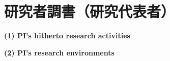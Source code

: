 
\section{研究者調書（研究代表者）}

\renewcommand{\研究者氏名}{湯川秀樹}
\renewcommand{\研究者氏名ふりがな}{ゆかわ　ひでき}
\renewcommand{\研究者生年月日の年}{1900}
\renewcommand{\研究者生年月日の月}{2}
\renewcommand{\研究者生年月日の日}{29}
\renewcommand{\研究者年齢}{139}
\renewcommand{\研究者所属機関部局職}{\small{逢坂大学\\ 原始殻研究所\\ 名誉教授}}	%
\renewcommand{\研究者学位}{理学博士}


\vspace*{-1.4cm}
	\noindent
	\textbf{(1) PI's hitherto research activities}\\
\PapersInstructions	%


	\noindent
	\textbf{(2) PI's research environments}\\

